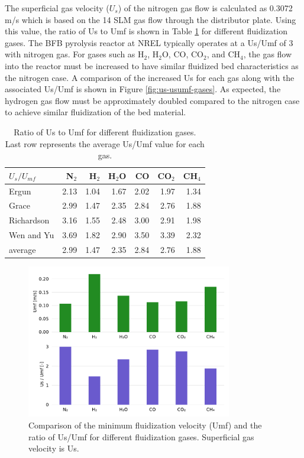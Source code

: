 The superficial gas velocity ($U_s$) of the nitrogen gas flow is calculated as 0.3072 m/s which is based on the 14 SLM gas flow through the distributor plate. Using this value, the ratio of Us to Umf is shown in Table \ref{tab:us-umf-ratio} for different fluidization gases. The BFB pyrolysis reactor at NREL typically operates at a Us/Umf of 3 with nitrogen gas. For gases such as H$_2$, H$_2$O, CO, CO$_2$, and CH$_4$, the gas flow into the reactor must be increased to have similar fluidized bed characteristics as the nitrogen case. A comparison of the increased Us for each gas along with the associated Us/Umf is shown in Figure \ref{fig:us-usumf-gases}. As expected, the hydrogen gas flow must be approximately doubled compared to the nitrogen case to achieve similar fluidization of the bed material.

\begin{table}[H]
    \centering
    \caption{Ratio of Us to Umf for different fluidization gases. Last row represents the average Us/Umf value for each gas.}
    \label{tab:us-umf-ratio}
    \begin{tabular}{lrrrrrr}
        \toprule
        $U_s/U_{mf}$ & N$_2$ & H$_2$ & H$_2$O & CO & CO$_2$ & CH$_4$ \\
        \midrule
        Ergun      & 2.13 & 1.04 & 1.67 & 2.02 & 1.97 & 1.34 \\
        Grace      & 2.99 & 1.47 & 2.35 & 2.84 & 2.76 & 1.88 \\
        Richardson & 3.16 & 1.55 & 2.48 & 3.00 & 2.91 & 1.98 \\
        Wen and Yu & 3.69 & 1.82 & 2.90 & 3.50 & 3.39 & 2.32 \\
        average    & 2.99 & 1.47 & 2.35 & 2.84 & 2.76 & 1.88 \\
        \bottomrule
    \end{tabular}
\end{table}

\begin{figure}[H]
    \centering
    \includegraphics[width=0.8\textwidth]{figures/umf-usumf-gases.pdf}
    \caption{Comparison of the minimum fluidization velocity (Umf) and the ratio of Us/Umf for different fluidization gases. Superficial gas velocity is Us.}
    \label{fig:umf-usumf-gases}
\end{figure}

